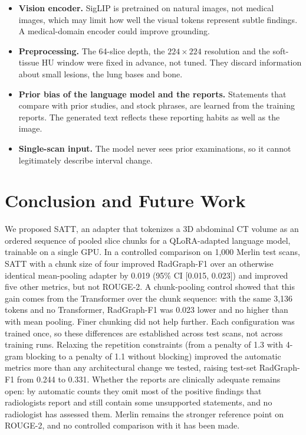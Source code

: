 \documentclass[conference]{IEEEtran}
\begin{document}
\begin{itemize}
the language model receives that order. We did not test an axial positional
encoding.
\item \textbf{Vision encoder.} SigLIP is pretrained on natural images, not
medical images, which may limit how well the visual tokens represent subtle
findings. A medical-domain encoder could improve grounding.
\item \textbf{Preprocessing.} The 64-slice depth, the $224\times224$
resolution and the soft-tissue HU window were fixed in advance, not tuned.
They discard information about small lesions, the lung bases and bone.
\item \textbf{Prior bias of the language model and the reports.} Statements
that compare with prior studies, and stock phrases, are learned from the
training reports. The generated text reflects these reporting habits as well
as the image.
\item \textbf{Single-scan input.} The model never sees prior examinations,
so it cannot legitimately describe interval change.
\end{itemize}

\section{Conclusion and Future Work}

We proposed SATT, an adapter that tokenizes a 3D abdominal CT volume as an
ordered sequence of pooled slice chunks for a QLoRA-adapted language model,
trainable on a single GPU. In a controlled comparison on 1,000 Merlin test
scans, SATT with a chunk size of four improved RadGraph-F1 over an otherwise
identical mean-pooling adapter by 0.019 (95\% CI [0.015, 0.023]) and improved
five other metrics, but not ROUGE-2. A chunk-pooling control showed that this
gain comes from the Transformer over the chunk sequence: with the same 3,136
tokens and no Transformer, RadGraph-F1 was 0.023 lower and no higher than
with mean pooling. Finer chunking did not help further.
Each configuration was trained once, so these differences are established
across test scans, not across training runs. Relaxing the repetition
constraints (from a penalty of 1.3 with 4-gram blocking to a penalty of 1.1
without blocking) improved the automatic metrics more than any architectural
change we tested, raising test-set RadGraph-F1 from 0.244 to 0.331. Whether
the reports are clinically adequate remains open: by automatic counts they
omit most of the positive findings that radiologists report and still contain
some unsupported statements, and no radiologist has assessed them. Merlin
remains the stronger reference point on ROUGE-2, and no controlled comparison
with it has been made.
\end{document}
